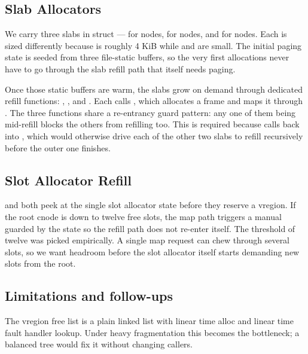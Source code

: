 \subsection{Slab Allocators}

We carry three slabs in struct  ---  for 
nodes,  for  nodes, and  for  nodes.
Each is sized differently because  is roughly 4 KiB while 
and  are small. The initial paging state is seeded from three
file-static buffers, so the very first allocations never have to go through the
slab refill path that itself needs paging.

\medskip\noindent
Once those static buffers are warm, the slabs grow on demand through dedicated
refill functions: , , and
. Each calls
, which allocates a frame and maps it through
. The three  functions share a
re-entrancy guard pattern: any one of them being mid-refill blocks the others
from refilling too. This is required because 
calls back into , which would otherwise drive
each of the other two slabs to refill recursively before the outer one finishes.

\subsection{Slot Allocator Refill}

 and  both
peek at the single slot allocator state before they reserve a vregion. If
the root cnode is down to twelve free slots, the map path triggers a manual
 guarded by the state 
so the refill path does not re-enter itself. The threshold of twelve was
picked empirically. A single map request can chew through several slots, so
we want headroom before the slot allocator itself starts demanding new slots
from the root.

\subsection{Limitations and follow-ups}

The vregion free list is a plain linked list with linear time alloc and
linear time fault handler lookup. Under heavy fragmentation this becomes
the bottleneck; a balanced tree would fix it without changing callers.

